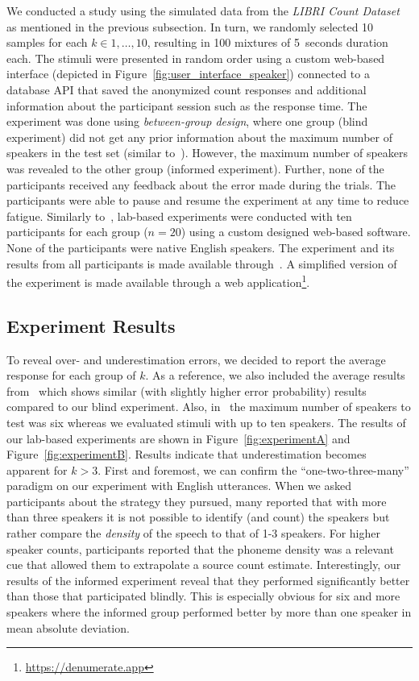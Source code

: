 We conducted a study using the simulated data from the \emph{LIBRI Count Dataset} as mentioned in the previous subsection.
In turn, we randomly selected 10 samples for each \(k \in {1, \ldots, 10}\), resulting in 100 mixtures of 5~seconds duration each.
The stimuli were presented in random order using a custom web-based interface (depicted in Figure~\ref{fig:user_interface_speaker}) connected to a database API that saved the anonymized count responses and additional information about the participant session such as the response time.
The experiment was done using \emph{between-group design}, where one group (blind experiment) did not get any prior information about the maximum number of speakers in the test set (similar to~\cite{kawashima15}).
However, the maximum number of speakers was revealed to the other group (informed experiment).
Further, none of the participants received any feedback about the error made during the trials.
The participants were able to pause and resume the experiment at any time to reduce fatigue.
Similarly to~\cite{kawashima15}, lab-based experiments were conducted with ten participants for each group (\(n=20\)) using a custom designed web-based software.
None of the participants were native English speakers.
The experiment and its results from all participants is made available through~\cite{oss_countit}.
A simplified version of the experiment is made available through a web application\footnote{\url{https://denumerate.app}}.

\subsection{Experiment Results}
To reveal over- and underestimation errors, we decided to report the average response for each group of \(k\).
As a reference, we also included the average results from~\cite[Experiment 1, 5~seconds duration]{kawashima15} which shows similar (with slightly higher error probability) results compared to our blind experiment.
Also, in~\cite{kawashima15} the maximum number of speakers to test was six whereas we evaluated stimuli with up to ten speakers.
The results of our lab-based experiments are shown in Figure~\ref{fig:experimentA} and Figure~\ref{fig:experimentB}.
Results indicate that underestimation becomes apparent for \(k > 3\).
First and foremost, we can confirm the ``one-two-three-many'' paradigm on our experiment with English utterances.
When we asked participants about the strategy they pursued, many reported that with more than three speakers it is not possible to identify (and count) the speakers but rather compare the \emph{density} of the speech to that of 1-3 speakers.
For higher speaker counts, participants reported that the phoneme density was a relevant cue that allowed them to extrapolate a source count estimate.
Interestingly, our results of the informed experiment reveal that they performed significantly better than those that participated blindly.
This is especially obvious for six and more speakers where the informed group performed better by more than one speaker in mean absolute deviation.

